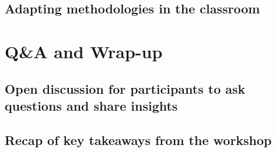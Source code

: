 \documentclass[
]{book}
\begin{document}
\hypertarget{adapting-methodologies-in-the-classroom}{%
\section*{Adapting methodologies in the classroom}\label{adapting-methodologies-in-the-classroom}}

\hypertarget{qa-and-wrap-up}{%
\chapter*{Q\&A and Wrap-up}\label{qa-and-wrap-up}}

\hypertarget{open-discussion-for-participants-to-ask-questions-and-share-insights}{%
\section*{Open discussion for participants to ask questions and share insights}\label{open-discussion-for-participants-to-ask-questions-and-share-insights}}

\hypertarget{recap-of-key-takeaways-from-the-workshop}{%
\section*{Recap of key takeaways from the workshop}\label{recap-of-key-takeaways-from-the-workshop}}

  
\end{document}
